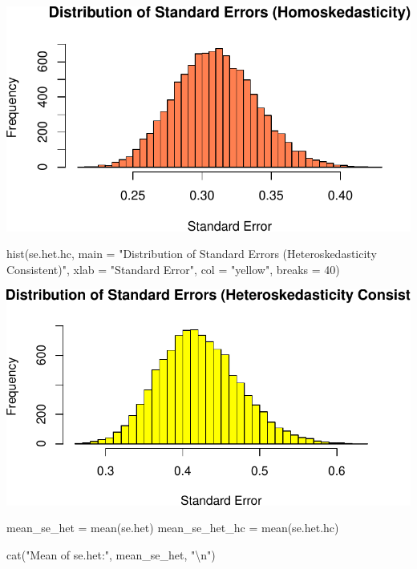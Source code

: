 \documentclass[
  11pt,
]{article}
\newenvironment{Shaded}{\begin{snugshade}}{\end{snugshade}}
\newcommand{\AttributeTok}[1]{\textcolor[rgb]{0.40,0.45,0.13}{#1}}
\newcommand{\DecValTok}[1]{\textcolor[rgb]{0.68,0.00,0.00}{#1}}
\newcommand{\FunctionTok}[1]{\textcolor[rgb]{0.28,0.35,0.67}{#1}}
\newcommand{\NormalTok}[1]{\textcolor[rgb]{0.00,0.23,0.31}{#1}}
\newcommand{\OtherTok}[1]{\textcolor[rgb]{0.00,0.23,0.31}{#1}}
\newcommand{\SpecialCharTok}[1]{\textcolor[rgb]{0.37,0.37,0.37}{#1}}
\newcommand{\StringTok}[1]{\textcolor[rgb]{0.13,0.47,0.30}{#1}}
\begin{document}
\includegraphics{HW-4-CODE-and-ANSWERS_files/figure-pdf/unnamed-chunk-20-1.pdf}

\begin{Shaded}
\begin{Highlighting}[]
\FunctionTok{hist}\NormalTok{(se.het.hc, }
     \AttributeTok{main =} \StringTok{"Distribution of Standard Errors (Heteroskedasticity Consistent)"}\NormalTok{, }
     \AttributeTok{xlab =} \StringTok{"Standard Error"}\NormalTok{, }\AttributeTok{col =} \StringTok{"yellow"}\NormalTok{, }\AttributeTok{breaks =} \DecValTok{40}\NormalTok{)}
\end{Highlighting}
\end{Shaded}

\includegraphics{HW-4-CODE-and-ANSWERS_files/figure-pdf/unnamed-chunk-20-2.pdf}

\begin{Shaded}
\begin{Highlighting}[]
\NormalTok{mean\_se\_het }\OtherTok{=} \FunctionTok{mean}\NormalTok{(se.het)}
\NormalTok{mean\_se\_het\_hc }\OtherTok{=} \FunctionTok{mean}\NormalTok{(se.het.hc)}

\FunctionTok{cat}\NormalTok{(}\StringTok{"Mean of se.het:"}\NormalTok{, mean\_se\_het, }\StringTok{"}\SpecialCharTok{\textbackslash{}n}\StringTok{"}\NormalTok{)}
\end{Highlighting}
\end{Shaded}
\end{document}
